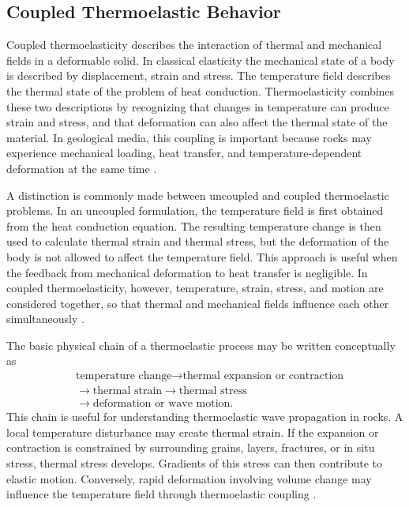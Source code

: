 \subsection{Coupled Thermoelastic Behavior}

Coupled thermoelasticity describes the interaction of thermal and mechanical fields in a deformable solid. In classical elasticity the mechanical state of a body is described by displacement, strain and stress. The temperature field describes the thermal state of the problem of heat conduction. Thermoelasticity combines these two descriptions by recognizing that changes in temperature can produce strain and stress, and that deformation can also affect the thermal state of the material. In geological media, this coupling is important because rocks may experience mechanical loading, heat transfer, and temperature-dependent deformation at the same time \cite{nowacki1986,boley1960}.

A distinction is commonly made between uncoupled and coupled thermoelastic problems. In an uncoupled formulation, the temperature field is first obtained from the heat conduction equation. The resulting temperature change is then used to calculate thermal strain and thermal stress, but the deformation of the body is not allowed to affect the temperature field. This approach is useful when the feedback from mechanical deformation to heat transfer is negligible. In coupled thermoelasticity, however, temperature, strain, stress, and motion are considered together, so that thermal and mechanical fields influence each other simultaneously \cite{jaeger2007,nowacki1986}.

The basic physical chain of a thermoelastic process may be written conceptually as
\begin{equation*}
\begin{aligned}
&\text{temperature change}
\rightarrow \text{thermal expansion or contraction} \\
&\rightarrow \text{thermal strain}
\rightarrow \text{thermal stress} \\
&\rightarrow \text{deformation or wave motion}.
\end{aligned}
\end{equation*}
This chain is useful for understanding thermoelastic wave propagation in rocks. A local temperature disturbance may create thermal strain. If the expansion or contraction is constrained by surrounding grains, layers, fractures, or in situ stress, thermal stress develops. Gradients of this stress can then contribute to elastic motion. Conversely, rapid deformation involving volume change may influence the temperature field through thermoelastic coupling \cite{boley1960,nowacki1986}.

